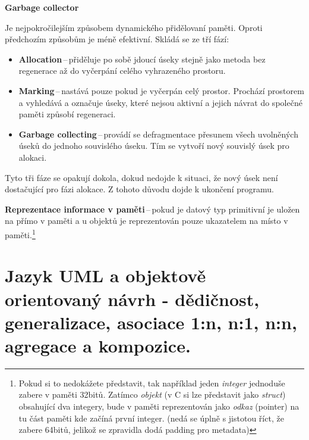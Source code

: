 \begin{Large}\vspace{0,5cm} \textbf{Garbage collector}
\end{Large}

 Je nejpokročilejším způsobem dynamického přidělovaní paměti. Oproti předchozím způsobům je méně efektivní. 
Skládá se ze tří fází:
\begin{itemize}
    \item \textbf{Allocation}\,--\,přiděluje po sobě jdoucí úseky stejně jako metoda bez regenerace až do vyčerpání celého vyhrazeného prostoru.
    \item\textbf{Marking}\,--\,nastává pouze pokud je vyčerpán celý prostor. Prochází prostorem a vyhledává a označuje úseky, které nejsou aktivní a jejich návrat do společné paměti způsobí regeneraci.
    \item\textbf{Garbage collecting}\,--\,provádí se defragmentace přesunem všech uvolněných úseků do jednoho souvislého úseku. Tím se vytvoří nový souvislý úsek pro alokaci.
\end{itemize}

 Tyto tři fáze se opakují dokola, dokud nedojde k situaci, že nový úsek není dostačující pro fázi alokace. Z tohoto důvodu dojde k ukončení programu.

\vspace{1cm}
\textbf{Reprezentace informace v paměti}\,--\,pokud je datový typ primitivní je uložen na přímo v paměti a u objektů je reprezentován pouze ukazatelem na místo v paměti.\footnote{Pokud si to nedokážete představit, tak například jeden \textit{integer} jednoduše zabere v paměti 32bitů. Zatímco \textit{objekt} (v C si lze představit jako \textit{struct}) obsahující dva integery, bude v paměti reprezentován jako \textit{odkaz} (pointer) na tu část paměti kde začíná první integer. (nedá se úplně s jistotou říct, že zabere 64bitů, jelikož se zpravidla dodá padding pro metadata)} 







\newpage
\section{Jazyk UML a objektově orientovaný návrh - dědičnost, generalizace, asociace 1:n, n:1, n:n, agregace a kompozice.}

